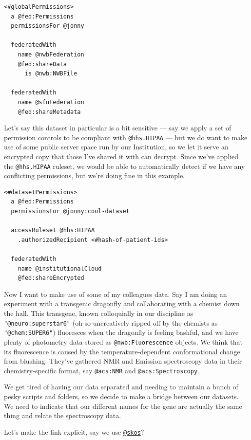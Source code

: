 \documentclass[10pt]{article}
\begin{document}
\begin{multicols}{2}
\begin{verbatim}
<#globalPermissions>
  a @fed:Permissions
  permissionsFor @jonny

  federatedWith 
    name @nwbFederation
    @fed:shareData 
      is @nwb:NWBFile

  federatedWith
    name @sfnFederation
    @fed:shareMetadata
\end{verbatim}

Let's say this dataset in particular is a bit sensitive --- say we apply
a set of permission controls to be compliant with \texttt{@hhs.HIPAA}
--- but we do want to make use of some public server space run by our
Institution, so we let it serve an encrypted copy that those I've shared
it with can decrypt. Since we've applied the \texttt{@hhs.HIPAA}
ruleset, we would be able to automatically detect if we have any
conflicting permissions, but we're doing fine in this example.

\begin{verbatim}
<#datasetPermissions>
  a @fed:Permissions
  permissionsFor @jonny:cool-dataset

  accessRuleset @hhs:HIPAA
    .authorizedRecipient <#hash-of-patient-ids>
  
  federatedWith
    name @institutionalCloud
    @fed:shareEncrypted
\end{verbatim}

Now I want to make use of some of my colleagues data. Say I am doing an
experiment with a transgenic dragonfly and collaborating with a chemist
down the hall. This transgene, known colloquially in our discipline as
\texttt{"@neuro:superstar6"} (oh-so-uncreatively ripped off by the
chemists as \texttt{"@chem:SUPER6"}) fluoresces when the dragonfly is
feeling bashful, and we have plenty of photometry data stored as
\texttt{@nwb:Fluorescence} objects. We think that its fluorescence is
caused by the temperature-dependent conformational change from blushing.
They've gathered NMR and Emission spectroscopy data in their
chemistry-specific format, say \texttt{@acs:NMR} and
\texttt{@acs:Spectroscopy}.

We get tired of having our data separated and needing to maintain a
bunch of pesky scripts and folders, so we decide to make a bridge
between our datasets. We need to indicate that our different names for
the gene are actually the same thing and relate the spectroscopy data.

Let's make the link explicit, say we use
\href{https://www.w3.org/2009/08/skos-reference/skos.html}{\texttt{@skos}}?


\end{multicols}
\end{document}
